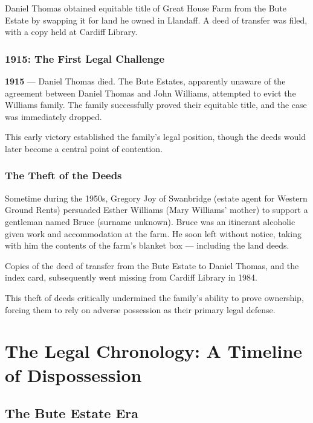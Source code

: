 \documentclass[11pt,a4paper]{article}
\begin{document}
Daniel Thomas obtained equitable title of Great House Farm from the Bute Estate by swapping it for land he owned in Llandaff. A deed of transfer was filed, with a copy held at Cardiff Library.

\subsubsection{1915: The First Legal Challenge}

\begin{timeline}
\textbf{1915} --- Daniel Thomas died. The Bute Estates, apparently unaware of the agreement between Daniel Thomas and John Williams, attempted to evict the Williams family. The family successfully proved their equitable title, and the case was immediately dropped.
\end{timeline}

This early victory established the family's legal position, though the deeds would later become a central point of contention.

\subsubsection{The Theft of the Deeds}

\begin{grievance}
Sometime during the 1950s, Gregory Joy of Swanbridge (estate agent for Western Ground Rents) persuaded Esther Williams (Mary Williams' mother) to support a gentleman named Bruce (surname unknown). Bruce was an itinerant alcoholic given work and accommodation at the farm. He soon left without notice, taking with him the contents of the farm's blanket box --- including the land deeds.

Copies of the deed of transfer from the Bute Estate to Daniel Thomas, and the index card, subsequently went missing from Cardiff Library in 1984.
\end{grievance}

This theft of deeds critically undermined the family's ability to prove ownership, forcing them to rely on adverse possession as their primary legal defense.

\newpage

\section{The Legal Chronology: A Timeline of Dispossession}

\subsection{The Bute Estate Era}
\end{document}

